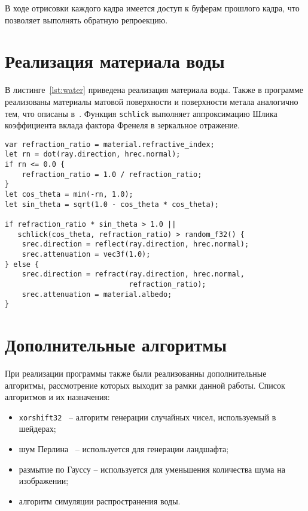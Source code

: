 В ходе отрисовки каждого кадра имеется доступ к буферам прошлого кадра,
что позволяет выполнять обратную репроекцию.

\section{Реализация материала воды}

В листинге~\ref{lst:water} приведена реализация материала воды. Также в программе реализованы
материалы матовой поверхности и поверхности метала аналогично тем, что описаны в~\cite{RTW}.
Функция \verb|schlick| выполняет аппроксимацию Шлика коэффициента вклада фактора Френеля в 
зеркальное отражение.

\begin{lstlisting}[caption={Реализация материала воды},label={lst:water},frame=single]
var refraction_ratio = material.refractive_index;
let rn = dot(ray.direction, hrec.normal);
if rn <= 0.0 {
    refraction_ratio = 1.0 / refraction_ratio;
}
let cos_theta = min(-rn, 1.0);
let sin_theta = sqrt(1.0 - cos_theta * cos_theta);

if refraction_ratio * sin_theta > 1.0 || 
   schlick(cos_theta, refraction_ratio) > random_f32() {
    srec.direction = reflect(ray.direction, hrec.normal);
    srec.attenuation = vec3f(1.0);
} else {
    srec.direction = refract(ray.direction, hrec.normal, 
                             refraction_ratio);
    srec.attenuation = material.albedo;
}
\end{lstlisting}

\section{Дополнительные алгоритмы}

При реализации программы также были реализованны дополнительные алгоритмы, рассмотрение 
которых выходит за рамки данной работы. Список алгоритмов и их назначения:
\begin{itemize}
    \item \verb|xorshift32|~\cite{xorshift} -- алгоритм генерации случайных чисел, используемый в шейдерах;
    \item шум Перлина~\cite{perlin} -- используется для генерации ландшафта;
    \item размытие по Гауссу -- используется для уменьшения количества шума на изображении;
    \item алгоритм симуляции распространения воды.
\end{itemize}

